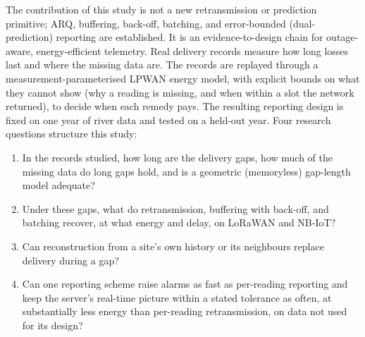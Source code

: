 The contribution of this study is not a new retransmission or prediction primitive; ARQ, buffering, back-off, batching, and error-bounded (dual-prediction) reporting are established. It is an evidence-to-design chain for outage-aware, energy-efficient telemetry. Real delivery records measure how long losses last and where the missing data are. The records are replayed through a measurement-parameterised LPWAN energy model, with explicit bounds on what they cannot show (why a reading is missing, and when within a slot the network returned), to decide when each remedy pays. The resulting reporting design is fixed on one year of river data and tested on a held-out year. Four research questions structure this study:
\begin{enumerate}
\item[RQ1] In the records studied, how long are the delivery gaps, how much of the missing data do long gaps hold, and is a geometric (memoryless) gap-length model adequate?
\item[RQ2] Under these gaps, what do retransmission, buffering with back-off, and batching recover, at what energy and delay, on LoRaWAN and NB-IoT?
\item[RQ3] Can reconstruction from a site's own history or its neighbours replace delivery during a gap?
\item[RQ4] Can one reporting scheme raise alarms as fast as per-reading reporting and keep the server's real-time picture within a stated tolerance as often, at substantially less energy than per-reading retransmission, on data not used for its design?
\end{enumerate}

